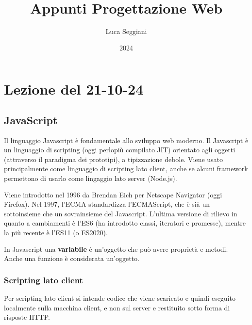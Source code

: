 \documentclass[a4paper,11pt]{article}
\title{Appunti Progettazione Web}
\author{Luca Seggiani}
\date{2024}
\begin{document}
\section{Lezione del 21-10-24}

\thispagestyle{empty}
\pagestyle{fancy}

\subsection{JavaScript}
Il linguaggio Javascript è fondamentale allo sviluppo web moderno.
Il Javascript è un linguaggio di scripting (oggi perlopiù compilato JIT) orientato agli oggetti (attraverso il paradigma dei prototipi), a tipizzazione debole.
Viene usato principalmente come linguaggio di scripting lato client, anche se alcuni framework permettono di usarlo come lingaggio lato server (Node.js).

Viene introdotto nel 1996 da Brendan Eich per Netscape Navigator (oggi Firefox).
Nel 1997, l'ECMA standardizza l'ECMAScript, che è sià un sottoinsieme che un sovrainsieme del Javascript.
L'ultima versione di rilievo in quanto a cambiamenti è l'ES6 (ha introdotto classi, iteratori e promesse), mentre la più recente è l'ES11 (o ES2020).

In Javascript una \textbf{variabile} è un'oggetto che può avere proprietà e metodi.
Anche una funzione è considerata un'oggetto.

\subsubsection{Scripting lato client}
Per scripting lato client si intende codice che viene scaricato e quindi eseguito localmente sulla macchina client, e non sul server e restituito sotto forma di risposte HTTP.
\end{document}
